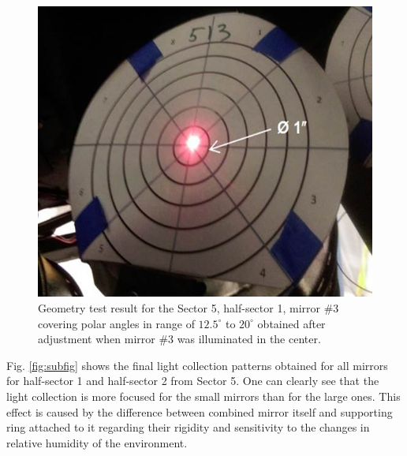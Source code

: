 \begin{figure}[ht]
    \centering
    \includegraphics[width=1.0\linewidth,trim={0 0cm 0 0},clip]{images/GEO_TEST_5_1_3_Center.jpg}
    \caption{Geometry test result for the Sector 5, half-sector 1, mirror \#3 covering polar angles in range of $12.5^\circ$ to $20^\circ$ obtained after adjustment when mirror \#3 was illuminated in the center.}
    \label{fig:GEO_TEST_5_1_3_Center}
\end{figure}

Fig. \ref{fig:subfig} shows the final light collection patterns obtained for all mirrors for half-sector 1 and half-sector 2 from Sector 5. One can clearly see that the light collection is more focused for the small mirrors than for the large ones. This effect is caused by the difference between combined mirror itself and supporting ring attached to it regarding their rigidity and sensitivity to the changes in relative humidity of the environment.
 

